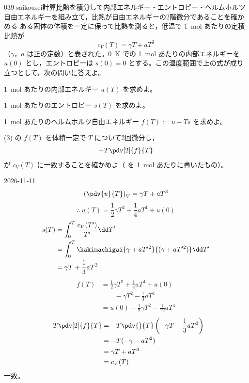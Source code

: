 \documentclass[uplatex,dvipdfmx,a4paper,11pt]{jsarticle}
\begin{document}
\begin{mondai}{039-saikousei}{計算}{比熱を積分して内部エネルギー・エントロピー・ヘルムホルツ自由エネルギーを組み立て，比熱が自由エネルギーの2階微分であることを確かめる}
ある固体の体積を一定に保って比熱を測ると，低温で \qty{1}{\mole} あたりの定積比熱が
  \[ c_{V}(T)=\gamma T+aT^{3} \]
  （$\gamma$，$a$ は正の定数）と表された。\qty{0}{\kelvin} での \qty{1}{\mole} あたりの内部エネルギーを $u(0)$ とし，エントロピーは $s(0)=0$ とする。この温度範囲で上の式が成り立つとして，次の問いに答えよ。
  \begin{shoumon}
    \item \qty{1}{\mole} あたりの内部エネルギー $u(T)$ を求めよ。
    \item \qty{1}{\mole} あたりのエントロピー $s(T)$ を求めよ。
    \item \qty{1}{\mole} あたりのヘルムホルツ自由エネルギー $f(T):=u-Ts$ を求めよ。
    \item (3) の $f(T)$ を体積一定で $T$ について2回微分し，
      \[ -T\pdv[2]{f}{T} \]
      が $c_{V}(T)$ に一致することを確かめよ（ を \qty{1}{\mole} あたりに書いたもの）。
  \end{shoumon}
\begin{kotaeutsushi}{2026-11-11}
\[ \left(\pdv{u}{T}\right)_{V}=\gamma T+aT^{3} \]
\[ \therefore\ u(T)=\frac{1}{2}\gamma T^{2}+\frac{1}{4}aT^{4}+u(0) \]
\begin{align*}
s(T)&=\int_{0}^{T}\frac{c_{V}(T')}{T'}\dd T'\\
&=\int_{0}^{T}\kakimachigai{\gamma+aT'^{2}}{(\gamma+aT'^{2})}\dd T'\\
&=\gamma T+\frac{1}{3}aT^{3}
\end{align*}
\begin{align*}
f(T)&=\frac{1}{2}\gamma T^{2}+\frac{1}{4}aT^{4}+u(0)\\
&\qquad-\gamma T^{2}-\frac{1}{3}aT^{4}\\
&=u(0)-\frac{1}{2}\gamma T^{2}-\frac{1}{12}aT^{4}
\end{align*}
\begin{align*}
-T\pdv[2]{f}{T}&=-T\pdv{}{T}\left(-\gamma T-\frac{1}{3}aT^{3}\right)\\
&=-T(-\gamma-aT^{2})\\
&=\gamma T+aT^{3}\\
&=c_{V}(T)
\end{align*}
一致。
\end{kotaeutsushi}
\end{mondai}
\end{document}
